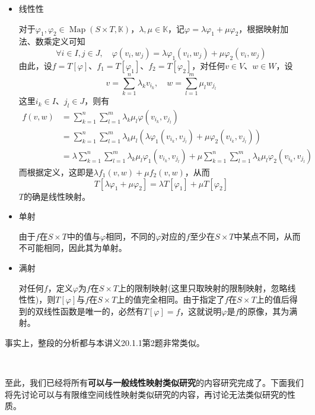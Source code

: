 \documentclass[a4paper,UTF8,fontset=windows,AutoFakeBold]{ctexart}
\DeclareMathOperator{\Map}{Map}
\newcommand*{\note}{\noindent *}
\begin{document}
\begin{enumerate}
{        \begin{itemize}
            \item 线性性
            
            对于$\varphi_1,\varphi_2\in\Map(S\times T,\mathbb{K})$，$\lambda,\mu\in\mathbb{K}$，记$\varphi=\lambda\varphi_1+\mu\varphi_2$，根据映射加法、数乘定义可知
            $$\forall i\in I,j\in J,\quad\varphi(v_i,w_j)=\lambda\varphi_1(v_i,w_j)+\mu\varphi_2(v_i,w_j)$$
            由此，设$f=T[\varphi]$、$f_1=T[\varphi_1]$、$f_2=T[\varphi_2]$，对任何$v\in V$、$w\in W$，设
            $$v=\sum_{k=1}^n\lambda_kv_{i_k},\quad w=\sum_{l=1}^m\mu_lw_{j_l}$$
            这里$i_k\in I$、$j_l\in J$，则有
            $$\begin{aligned}f(v,w)&=\sum_{k=1}^n\sum_{l=1}^m\lambda_k\mu_l\varphi(v_{i_k},v_{j_l})\\ &=\sum_{k=1}^n\sum_{l=1}^m\lambda_k\mu_l(\lambda\varphi_1(v_{i_k},v_{j_l})+\mu\varphi_2(v_{i_k},v_{j_l}))\\ &=\lambda\sum_{k=1}^n\sum_{l=1}^m\lambda_k\mu_l\varphi_1(v_{i_k},v_{j_l})+\mu\sum_{k=1}^n\sum_{l=1}^m\lambda_k\mu_l\varphi_2(v_{i_k},v_{j_l})\end{aligned}$$
            而根据定义，这即是$\lambda f_1(v,w)+\mu f_2(v,w)$，从而
            $$T[\lambda\varphi_1+\mu\varphi_2]=\lambda T[\varphi_1]+\mu T[\varphi_2]$$
            $T$的确是线性映射。

            \item 单射
            
            由于$f$在$S\times T$中的值与$\varphi$相同，不同的$\varphi$对应的$f$至少在$S\times T$中某点不同，从而不可能相同，因此其为单射。

            \item 满射
            
            对任何$f$，定义$\varphi$为$f$在$S\times T$上的限制映射(这里只取映射的限制映射，忽略线性性)，则$T[\varphi]$与$f$在$S\times T$上的值完全相同。由于指定了$f$在$S\times T$上的值后得到的双线性函数是唯一的，必然有$T[\varphi]=f$，这就说明$\varphi$是$f$的原像，其为满射。
        \end{itemize}
    }

\end{enumerate}

\note 事实上，整段的分析都与本讲义20.1.1第2题非常类似。

\

至此，我们已经将所有\textbf{可以与一般线性映射类似研究}的内容研究完成了。下面我们将先讨论可以与有限维空间线性映射类似研究的内容，再讨论无法类似研究的性质。
\end{document}
